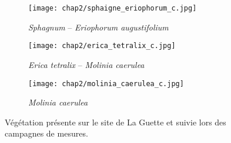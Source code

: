\begin{figure}[htbp]
    \centering
    \begin{subfigure}[b]{.98\textwidth} %
        \centering \texttt{[image: chap2/sphaigne\_eriophorum\_c.jpg]}
        \caption{\textit{Sphagnum} -- \textit{Eriophorum augustifolium}}\label{fig:sphg_erio}
    \end{subfigure}
    
    \begin{subfigure}[b]{0.49\textwidth}
        \centering \texttt{[image: chap2/erica\_tetralix\_c.jpg]}
        \caption{\textit{Erica tetralix} -- \textit{Molinia caerulea}}\label{fig:erica}
    \end{subfigure}
    \begin{subfigure}[b]{0.49\textwidth}
        \centering \texttt{[image: chap2/molinia\_caerulea\_c.jpg]}
        \caption{\textit{Molinia caerulea}}\label{fig:mol}
    \end{subfigure}

    \caption{Végétation présente sur le site de La Guette et suivie lors des campagnes de mesures.}\label{fig:veg}
\end{figure}


%
%


